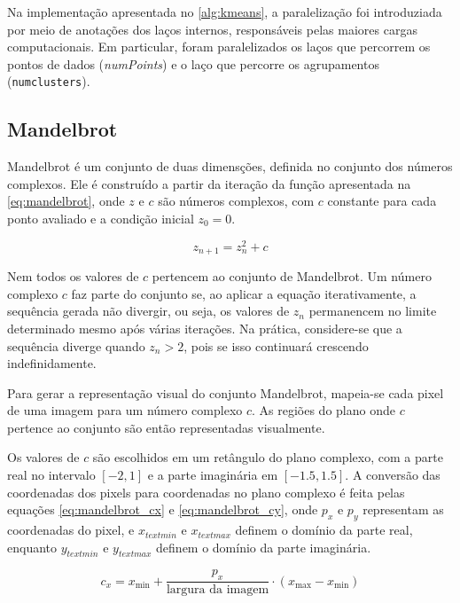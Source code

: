 Na implementação apresentada no \autoref{alg:kmeans}, a paralelização foi introduziada por meio de anotações dos laços internos, responsáveis pelas maiores cargas computacionais. Em particular, foram paralelizados os laços que percorrem os pontos de dados (\textit{numPoints}) e o laço que percorre os agrupamentos (\texttt{numclusters}).

\subsection{Mandelbrot}\label{subsec:mandelbrot}

Mandelbrot é um conjunto de duas dimensções, definida no conjunto dos números complexos. Ele é construído a partir da iteração da função apresentada na \autoref{eq:mandelbrot}, onde $z$ e $c$ são números complexos, com $c$ constante para cada ponto avaliado e a condição inicial $z_0 = 0$.

\begin{equation}
	\label{eq:mandelbrot}
	z_{n + 1} = z_n^{2} + c
\end{equation}

Nem todos os valores de $c$ pertencem ao conjunto de Mandelbrot. Um número complexo $c$ faz parte do conjunto se, ao aplicar a equação iterativamente, a sequência gerada não divergir, ou seja, os valores de $z_n$ permanencem no limite determinado mesmo após várias iterações. Na prática, considere-se que a sequência diverge quando $z_n > 2$, pois se isso continuará crescendo indefinidamente.

Para gerar a representação visual do conjunto Mandelbrot, mapeia-se cada pixel de uma imagem para um número complexo $c$. As regiões do plano onde $c$ pertence ao conjunto são então representadas visualmente.

Os valores de $c$ são escolhidos em um retângulo do plano complexo, com a parte real no intervalo $[-2, 1]$ e a parte imaginária em $[-1.5, 1.5]$. A conversão das coordenadas dos pixels para coordenadas no plano complexo é feita pelas equações \autoref{eq:mandelbrot_cx} e \autoref{eq:mandelbrot_cy}, onde $p_x$ e $p_y$ representam as coordenadas do pixel, e $x_{text{min}}$ e $x_{text{max}}$ definem o domínio da parte real, enquanto $y_{text{min}}$ e $y_{text{max}}$ definem o domínio da parte imaginária.

\begin{equation}
	\label{eq:mandelbrot_cx}
	c_x = x_{\text{min}} + \frac{p_x}{\text{largura da imagem}} \cdot (x_{\text{max}} - x_{\text{min}})
\end{equation}

